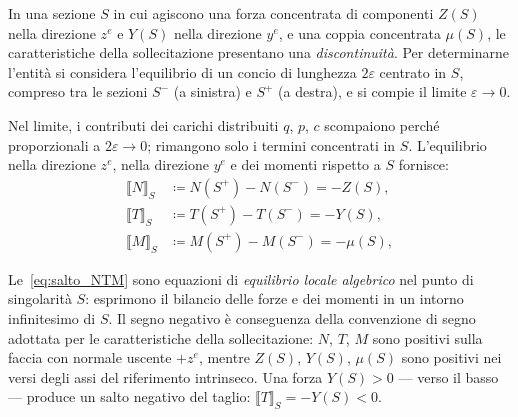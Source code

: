 In una sezione $S$ in cui agiscono una forza
concentrata di componenti $Z(S)$ nella direzione
$z^e$ e $Y(S)$ nella direzione $y^e$, e una coppia
concentrata $\mu(S)$, le caratteristiche della
sollecitazione presentano una \emph{discontinuità}.
Per determinarne l'entità si considera l'equilibrio
di un concio di lunghezza $2\varepsilon$ centrato
in $S$, compreso tra le sezioni $S^-$ (a sinistra)
e $S^+$ (a destra), e si compie il limite
$\varepsilon \to 0$.

Nel limite, i contributi dei carichi distribuiti
$q$, $p$, $c$ scompaiono perché proporzionali a
$2\varepsilon \to 0$; rimangono solo i termini
concentrati in $S$. L'equilibrio nella direzione
$z^e$, nella direzione $y^e$ e dei momenti rispetto
a $S$ fornisce:
\begin{equation}
	\boxed{\begin{aligned}
			\llbracket N \rrbracket_S &\coloneqq
			N(S^+) - N(S^-) = -Z(S),\\
			\llbracket T \rrbracket_S &\coloneqq
			T(S^+) - T(S^-) = -Y(S),\\
			\llbracket M \rrbracket_S &\coloneqq
			M(S^+) - M(S^-) = -\mu(S),
	\end{aligned}}
	\label{eq:salto_NTM}
\end{equation}

\begin{oss}
	Le~\eqref{eq:salto_NTM}
	sono equazioni di \emph{equilibrio locale
		algebrico} nel punto di singolarità $S$:
	esprimono il bilancio delle forze e dei momenti
	in un intorno infinitesimo di $S$. Il segno
	negativo è conseguenza della convenzione di
	segno adottata per le caratteristiche della
	sollecitazione: $N$, $T$, $M$ sono positivi
	sulla faccia con normale uscente $+z^e$, mentre
	$Z(S)$, $Y(S)$, $\mu(S)$ sono positivi nei
	versi degli assi del riferimento intrinseco.
	Una forza $Y(S) > 0$ --- verso il basso ---
	produce un salto negativo del taglio:
	$\llbracket T \rrbracket_S = -Y(S) < 0$.
\end{oss}


